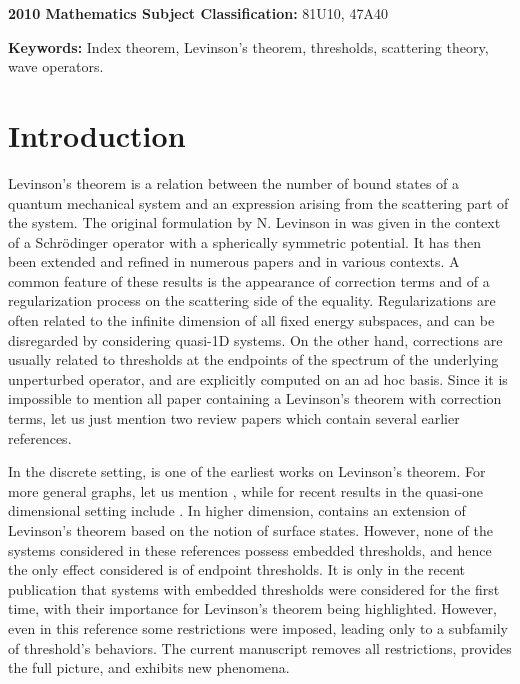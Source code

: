 \documentclass[11pt]{article}
\begin{document}
\textbf{2010 Mathematics Subject Classification:} 81U10, 47A40

\smallskip

\textbf{Keywords:} Index theorem, Levinson's theorem, thresholds, scattering theory, wave operators.


\section{Introduction}\label{sec:intro}
\setcounter{equation}{0}

Levinson’s theorem is a relation between the number of bound states of a quantum
mechanical system and an expression arising from the scattering part of the system.
The original formulation by N. Levinson in \cite{Lev} was given in the context of
a Schr\"odinger operator with a spherically symmetric potential.
It has then been extended and refined in numerous papers and in various contexts. 
A common feature of these results is the appearance of correction terms
and of a regularization process on the scattering side of the equality. 
Regularizations are often  related to
the infinite dimension of all fixed energy subspaces, and can
be disregarded by considering quasi-1D systems.
On the other hand, corrections are usually related
to thresholds at the endpoints of the spectrum of the underlying
unperturbed operator, and are explicitly computed on an ad hoc basis.
Since it is impossible to mention all paper containing a Levinson's theorem 
with correction terms,
let us just mention two review papers \cite{Ma,Ri} which contain several
earlier references.

In the discrete setting, \cite{HKS} is one of the earliest works on Levinson's theorem.
For more general graphs, let us mention \cite{BSB,ChildI, ChildII}, 
while for recent results in the quasi-one dimensional setting include \cite{Bal1, Bal2, Bal3,IT19}.  In higher dimension, \cite{SB16} contains an extension of Levinson's theorem based on the notion of surface states. However, none of the systems considered in these references 
possess embedded thresholds, and hence the only effect considered is of endpoint thresholds.
It is only in the recent publication \cite{APRR} that systems with embedded thresholds
were considered for the first time, with their importance for Levinson’s theorem being highlighted.
However, even in this reference some restrictions were imposed, leading only to a subfamily of threshold's behaviors. The current manuscript removes all restrictions, provides the full picture, and exhibits new phenomena.
\end{document}
